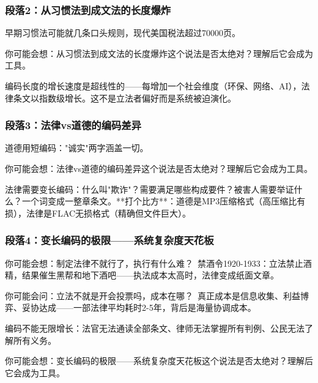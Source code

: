 \documentclass[a4paper,12pt]{book}
\newenvironment{motivation}{\begin{tcolorbox}[colback=gray!10,colframe=gray!60,title=\textit{动机}]\small\itshape}{\end{tcolorbox}}
\begin{document}
\begin{motivation}
\begin{motivation}
\begin{motivation}
	\subsubsection*{段落2：从习惯法到成文法的长度爆炸}
	早期习惯法可能就几条口头规则，现代美国税法超过70000页。
	\begin{tcolorbox}[colback=yellow!5, title=\textit{读者行为预测}]
		你可能会想：从习惯法到成文法的长度爆炸这个说法是否太绝对？理解后它会成为工具。
	\end{tcolorbox}

编码长度的增长速度是超线性的——每增加一个社会维度（环保、网络、AI），法律条文以指数级增长。这不是立法者偏好而是系统被迫演化。

	\subsubsection*{段落3：法律vs道德的编码差异}
	道德用短编码："诚实"两字涵盖一切。
	\begin{tcolorbox}[colback=yellow!5, title=\textit{读者行为预测}]
		你可能会想：法律vs道德的编码差异这个说法是否太绝对？理解后它会成为工具。
	\end{tcolorbox}

法律需要变长编码：什么叫"欺诈"？需要满足哪些构成要件？被害人需要举证什么？一个词变成一整章条文。**打个比方**：道德是MP3压缩格式（高压缩比有损），法律是FLAC无损格式（精确但文件巨大）。

	\subsubsection*{段落4：变长编码的极限——系统复杂度天花板}

	\begin{tcolorbox}[colback=yellow!5, title=\textit{读者行为预测}]
		你可能会想：制定法律不就行了，执行有什么难？\ 禁酒令1920-1933：立法禁止酒精，结果催生黑帮和地下酒吧——执法成本太高时，法律变成纸面文章。
	\end{tcolorbox}


	\begin{tcolorbox}[colback=yellow!5, title=\textit{读者行为预测}]
		你可能会问：立法不就是开会投票吗，成本在哪？\ 真正成本是信息收集、利益博弈、妥协达成——一部法律平均耗时2-5年，背后是海量协调成本。
	\end{tcolorbox}

	编码不能无限增长：法官无法通读全部条文、律师无法掌握所有判例、公民无法了解所有义务。
	\begin{tcolorbox}[colback=yellow!5, title=\textit{读者行为预测}]
		你可能会想：变长编码的极限——系统复杂度天花板这个说法是否太绝对？理解后它会成为工具。
	\end{tcolorbox}


\end{motivation}
\end{motivation}
\end{motivation}
\end{document}
